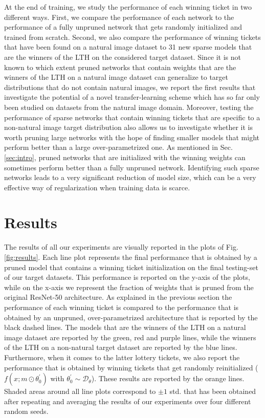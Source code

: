 At the end of training, we study the performance of each winning ticket in two different ways. First, we compare the performance of each network to the performance of a fully unpruned network that gets randomly initialized and trained from scratch. Second, we also compare the performance of winning tickets that have been found on a natural image dataset to 31 new sparse models that are the winners of the LTH on the considered target dataset. Since it is not known to which extent pruned networks that contain weights that are the winners of the LTH on a natural image dataset can generalize to target distributions that do not contain natural images, we report the first results that investigate the potential of a novel transfer-learning scheme which has so far only been studied on datasets from the natural image domain. Moreover, testing the performance of sparse networks that contain winning tickets that are specific to a non-natural image target distribution also allows us to investigate whether it is worth pruning large networks with the hope of finding smaller models that might perform better than a large over-parametrized one. As mentioned in Sec. \ref{sec:intro}, pruned networks that are initialized with the winning weights can sometimes perform better than a fully unpruned network. Identifying such sparse networks leads to a very significant reduction of model size, which can be a very effective way of regularization when training data is scarce.

\section{Results}
\label{sec:results}
The results of all our experiments are visually reported in the plots of Fig. \ref{fig:results}. Each line plot represents the final performance that is obtained by a pruned model that contains a winning ticket initialization on the final testing-set of our target datasets. This performance is reported on the y-axis of the plots, while on the x-axis we represent the fraction of weights that is pruned from the original ResNet-50 architecture. As explained in the previous section the performance of each winning ticket is compared to the performance that is obtained by an unpruned, over-parametrized architecture that is reported by the black dashed lines. The models that are the winners of the LTH on a natural image dataset are reported by the green, red and purple lines, while the winners of the LTH on a non-natural target dataset are reported by the blue lines. Furthermore, when it comes to the latter lottery tickets, we also report the performance that is obtained by winning tickets that get randomly reinitialized ($f(x;m\odot\theta^{'}_{0})$ with $\theta^{'}_{0} \sim \mathcal{D}_\theta$). These results are reported by the orange lines. Shaded areas around all line plots correspond to $\pm 1$ std. that has been obtained after repeating and averaging the results of our experiments over four different random seeds.

